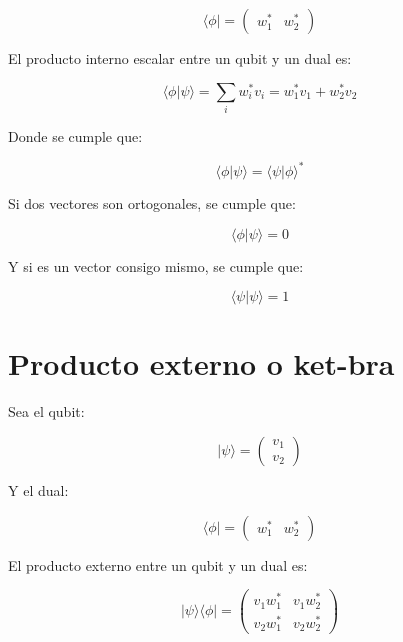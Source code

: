 \documentclass[11pt]{article}
\begin{document}
\begin{equation}
    \langle \phi | = \begin{pmatrix} w_1^* & w_2^* \end{pmatrix}
\end{equation}

El producto interno escalar entre un qubit y un dual es:

\begin{equation}
    \langle \phi | \psi \rangle = \sum_{i} w_i^* v_i = w_1^* v_1 + w_2^* v_2
\end{equation}

Donde se cumple que:

\begin{equation}
    \langle \phi | \psi \rangle = \langle \psi | \phi \rangle^*
\end{equation}

Si dos vectores son ortogonales, se cumple que:

\begin{equation}
    \langle \phi | \psi \rangle = 0
\end{equation}

Y si es un vector consigo mismo, se cumple que:

\begin{equation}
    \langle \psi | \psi \rangle = 1
\end{equation}

\section{Producto externo o ket-bra}

Sea el qubit:

\begin{equation}
    |\psi\rangle = \begin{pmatrix} v_1 \\ v_2 \end{pmatrix}
\end{equation}

Y el dual:

\begin{equation}
    \langle \phi | = \begin{pmatrix} w_1^* & w_2^* \end{pmatrix}
\end{equation}

El producto externo entre un qubit y un dual es:

\begin{equation}
    |\psi\rangle \langle \phi | = \begin{pmatrix} v_1 w_1^* & v_1 w_2^* \\ v_2 w_1^* & v_2 w_2^* \end{pmatrix}
\end{equation}
\end{document}

